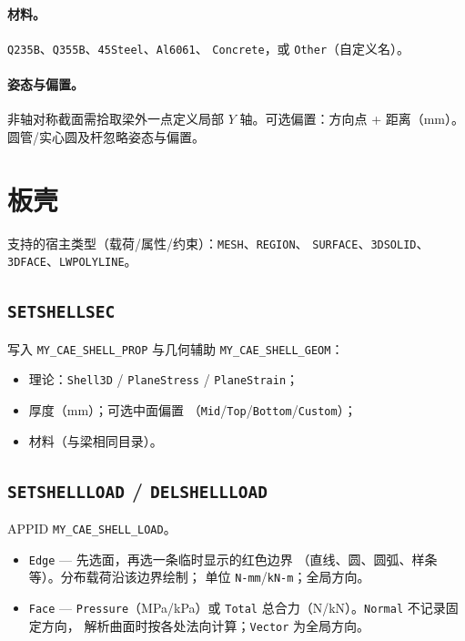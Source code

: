 \documentclass[a4paper]{ltxdoc}
\newcommand{\cadcmd}[1]{\texttt{\textbf{#1}}}
\newcommand{\appid}[1]{\texttt{#1}}
\begin{document}
\paragraph{材料。}
\texttt{Q235B}、\texttt{Q355B}、\texttt{45Steel}、\texttt{Al6061}、
\texttt{Concrete}，或 \texttt{Other}（自定义名）。

\paragraph{姿态与偏置。}
非轴对称截面需拾取梁外一点定义局部 $Y$ 轴。可选偏置：方向点 + 距离（mm）。
圆管/实心圆及杆忽略姿态与偏置。

\section{板壳}

支持的宿主类型（载荷/属性/约束）：\texttt{MESH}、\texttt{REGION}、
\texttt{SURFACE}、\texttt{3DSOLID}、\texttt{3DFACE}、\texttt{LWPOLYLINE}。

\subsection{\cadcmd{SETSHELLSEC}}
写入 \appid{MY\_CAE\_SHELL\_PROP} 与几何辅助
\appid{MY\_CAE\_SHELL\_GEOM}：
\begin{itemize}[nosep]
  \item 理论：\texttt{Shell3D} / \texttt{PlaneStress} / \texttt{PlaneStrain}；
  \item 厚度（mm）；可选中面偏置
        （\texttt{Mid}/\texttt{Top}/\texttt{Bottom}/\texttt{Custom}）；
  \item 材料（与梁相同目录）。
\end{itemize}

\subsection{\cadcmd{SETSHELLLOAD} / \cadcmd{DELSHELLLOAD}}
APPID \appid{MY\_CAE\_SHELL\_LOAD}。
\begin{itemize}[nosep]
  \item \texttt{Edge} --- 先选面，再选一条临时显示的红色边界
        （直线、圆、圆弧、样条等）。分布载荷沿该边界绘制；
        单位 \texttt{N-mm}/\texttt{kN-m}；全局方向。
  \item \texttt{Face} --- \texttt{Pressure}（MPa/kPa）或
        \texttt{Total} 总合力（N/kN）。\texttt{Normal} 不记录固定方向，
        解析曲面时按各处法向计算；\texttt{Vector} 为全局方向。
\end{itemize}
\end{document}
